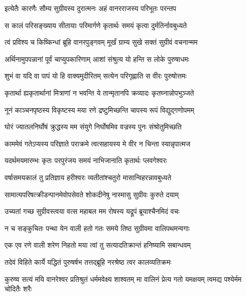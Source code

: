 \twolineshloka
{इत्येतैः कारणैः सौम्य सुग्रीवस्य दुरात्मनः}
{अहं वानरराजस्य परिभूतः परन्तप} %

\twolineshloka
{स कालं परिसङ्ख्याय सीतायाः परिमार्गणे}
{कृतार्थः समयं कृत्वा दुर्मतिर्नावबुध्यते} %

\twolineshloka
{त्वं प्रविश्य च किष्किन्धां ब्रूहि वानरपुङ्गवम्}
{मूर्खं ग्राम्य सुखे सक्तं सुग्रीवं वचनान्मम} %

\twolineshloka
{अर्थिनामुपपन्नानां पूर्वं चाप्युपकारिणाम्}
{आशां संश्रुत्य यो हन्ति स लोके पुरुषाधमः} %

\twolineshloka
{शुभं वा यदि वा पापं यो हि वाक्यमुदीरितम्}
{सत्येन परिगृह्णाति स वीरः पुरुषोत्तमः} %

\twolineshloka
{कृतार्था ह्यकृतार्थानां मित्राणां न भवन्ति ये}
{तान्मृतानपि क्रव्यादः कृतघ्नान्नोपभुञ्जते} %

\twolineshloka
{नूनं काञ्चनपृष्ठस्य विकृष्टस्य मया रणे}
{द्रष्टुमिच्छन्ति चापस्य रूपं विद्युद्गणोपमम्} %

\twolineshloka
{घोरं ज्यातलनिर्घोषं क्रुद्धस्य मम संयुगे}
{निर्घोषमिव वज्रस्य पुनः संश्रोतुमिच्छति} %

\twolineshloka
{काममेवं गतेऽप्यस्य परिज्ञाते पराक्रमे}
{त्वत्सहायस्य मे वीर न चिन्ता स्यान्नृपात्मज} %

\twolineshloka
{यदर्थमयमारम्भः कृतः परपुरंजय}
{समयं नाभिजानाति कृतार्थः प्लवगेश्वरः} %

\twolineshloka
{वर्षासमयकालं तु प्रतिज्ञाय हरीश्वरः}
{व्यतीतांश्चतुरो मासान्विहरन्नावबुध्यते} %

\twolineshloka
{सामात्यपरिषत्क्रीडन्पानमेवोपसेवते}
{शोकदीनेषु नास्मासु सुग्रीवः कुरुते दयाम्} %

\twolineshloka
{उच्यतां गच्छ सुग्रीवस्त्वया वत्स महाबल}
{मम रोषस्य यद्रूपं ब्रूयाश्चैनमिदं वचः} %

\twolineshloka
{न च सङ्कुचितः पन्था येन वाली हतो गतः}
{समये तिष्ठ सुग्रीवमा वालिपथमन्वगाः} %

\twolineshloka
{एक एव रणे वाली शरेण निहतो मया}
{त्वां तु सत्यादतिक्रान्तं हनिष्यामि सबान्धवम्} %

\twolineshloka
{तदेवं विहिते कार्ये यद्धितं पुरुषर्षभ}
{तत्तद्ब्रूहि नरश्रेष्ठ त्वर कालव्यतिक्रमः} %

\fourlineindentedshloka
{कुरुष्व सत्यं मयि वानरेश्वर}
{प्रतिश्रुतं धर्ममवेक्ष्य शाश्वतम्}
{मा वालिनं प्रेत्य गतो यमक्षयम्}
{त्वमद्य पश्येर्मम चोदितैः शरैः} %


